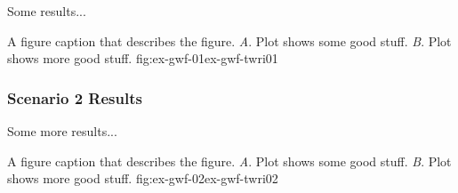 Some results...

\begin{StandardFigure}{
                                     A figure caption that describes the figure. 
                                     \textit{A}. Plot shows some good stuff.
                                     \textit{B}. Plot shows more good stuff.
                                     }{fig:ex-gwf-01}{ex-gwf-twri01}
\end{StandardFigure}                                 


\subsubsection{Scenario 2 Results}


Some more results...

\begin{StandardFigure}{
                                     A figure caption that describes the figure. 
                                     \textit{A}. Plot shows some good stuff.
                                     \textit{B}. Plot shows more good stuff.
                                     }{fig:ex-gwf-02}{ex-gwf-twri02}
\end{StandardFigure}                                 

